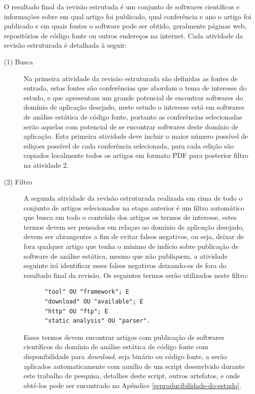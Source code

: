 O resultado final da revisão estrutuda é um conjunto de softwares científicos e
informações sobre em qual artigo foi publicado, qual conferência e ano o artigo
foi publicado e em quais fontes o software pode ser obtido, geralmente páginas
web, repositórios de código fonte ou outros endereços na internet. Cada
atividade da revisão estruturada é detalhada à seguir:

\begin{description}

  \item[(1) Busca]
    Na primeira atividade da revisão estruturada são definidas as fontes de
    entrada, estas fontes são conferências que abordam o tema de interesse do
    estudo, e que apresentam um grande potencial de encontrar softwares do
    domínio de aplicação desejado, neste estudo o interesse está em softwares
    de análise estática de código fonte, portanto as conferências selecionadas
    serão aquelas com potencial de se encontrar softwares deste domínio de
    aplicação. Esta primeira atividade deve incluir o maior número possível de
    ediçoes possível de cada conferência selecionada, para cada edição são
    copiados localmente todos os artigos em formato PDF para posterior filtro
    na atividade 2.

  \item[(2) Filtro]
    A segunda atividade da revisão estruturada realizada em cima de todo o
    conjunto de artigos selecionados na etapa anterior é um filtro automático
    que busca em todo o conteúdo dos artigos os termos de interesse, estes
    termos devem ser pensados em relaçao ao domínio de aplicação desejado,
    devem ser abrangentes a fim de evitar falsos negativos, ou seja, deixar de
    fora qualquer artigo que tenha o mínimo de indício sobre publicação de
    software de análise estática, mesmo que não publiquem, a atividade seguinte
    irá identificar esses falsos negativos deixando-os de fora do resultado
    final da revisão. Os seguintes termos serão utilizados neste filtro:

    \begin{verbatim}
      "tool" OU "framework"; E
      "download" OU "available"; E
      "http" OU "ftp"; E
      "static analysis" OU "parser".
    \end{verbatim}

    Esses termos devem encontrar artigos com publicação de softwares
    científicos do domínio de análise estática de código fonte com
    disponibilidade para {\it download}, seja binário ou código fonte,
    a serão aplicados automaticamente com auxílio de um script desenvlvido
    durante este trabalho de pesquisa, detalhes deste script, outros artefatos,
    e onde obtê-los pode ser encontrado no Apêndice
    \ref{reproducibilidade-do-estudo}.


\end{description}
